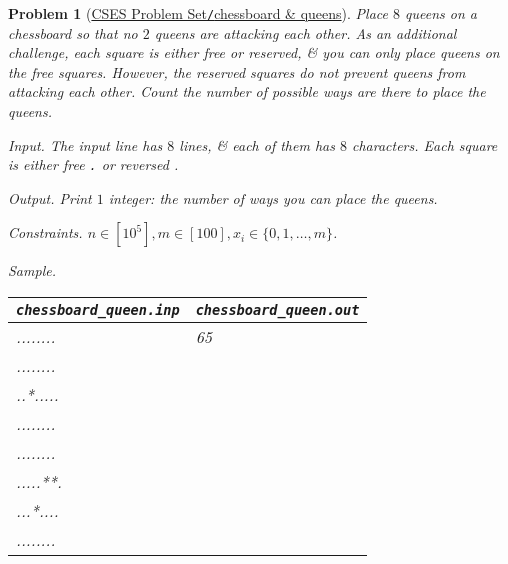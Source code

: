 \documentclass{article}
\newtheorem{problem}{Problem}
\begin{document}
\begin{problem}[\href{https://cses.fi/problemset/task/1624}{CSES Problem Set{\tt/}chessboard \& queens}]
    Place $8$ queens on a chessboard so that no $2$ queens are attacking each other. As an additional challenge, each square is either free or reserved, \& you can only place queens on the free squares. However, the reserved squares do not prevent queens from attacking each other. Count the number of possible ways are there to place the queens.
    \item {\sf Input.} The input line has $8$ lines, \& each of them has $8$ characters. Each square is either free {\tt.} or reversed {\tt*}.
    \item {\sf Output.} Print $1$ integer: the number of ways you can place the queens.
    \item {\sf Constraints.} $n\in[10^5],m\in[100],x_i\in\{0,1,\ldots,m\}$.
    \item {\sf Sample.}
    \begin{table}[H]
        \centering
        \begin{tabular}{|l|l|}
            \hline
            \verb|chessboard_queen.inp| & \verb|chessboard_queen.out| \\
            \hline
            ........ & 65 \\
            ........ & \\
            ..*..... & \\
            ........ & \\
            ........ & \\
            .....**. & \\
            ...*.... & \\
            ........ & \\
            \hline
        \end{tabular}
    \end{table}
\end{problem}
\end{document}
